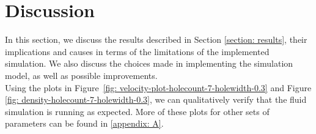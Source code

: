 \section{Discussion} \label{section: discussion}

In this section, we discuss the results described in Section \ref{section: results}, their implications and causes in terms of the limitations of the implemented simulation. We also discuss the choices made in implementing the simulation model, as well as possible improvements. \\

Using the plots in Figure~\ref{fig: velocity-plot-holecount-7-holewidth-0.3} and Figure \ref{fig: density-holecount-7-holewidth-0.3}, we can qualitatively verify that the fluid simulation is running as expected. More of these plots for other sets of parameters can be found in \ref{appendix: A}. \\

